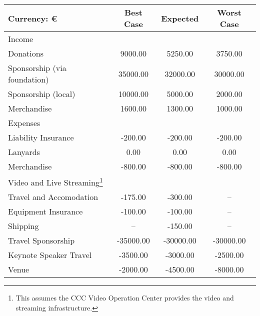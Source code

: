 \begin{tabularx}{\linewidth}{XSSS}
 Currency: \si{\euro}  & {Best Case} & {Expected} & {Worst Case} \\
  \hline\hline
Income \hspace*{1em}  & {} & {} & {}\\
\hspace*{1em} Donations  & 9000.00 & 5250.00 & 3750.00\\
\hspace*{1em} Sponsorship (via foundation)  & 35000.00 & 32000.00 & 30000.00\\
\hspace*{1em} Sponsorship (local)  & 10000.00 & 5000.00 & 2000.00\\
\hspace*{1em} Merchandise  & 1600.00 & 1300.00 & 1000.00\\[0.5ex]
Expenses \hspace*{1em}  & {} & {} & {}\\
\hspace*{1em} Liability Insurance  & -200.00 & -200.00 & -200.00\\
\hspace*{1em} Lanyards  & 0.00 & 0.00 & 0.00\\
\hspace*{1em} Merchandise  & -800.00 & -800.00 & -800.00\\
\hspace*{1em} Video and Live Streaming\footnote{This assumes the CCC Video Operation Center provides the video and streaming infrastructure.}  & {} & {} & {}\\
\hspace*{1em} \hspace*{1em} Travel and Accomodation & -175.00 & -300.00 & {–}\\
\hspace*{1em} \hspace*{1em} Equipment Insurance & -100.00 & -100.00 & {–}\\
\hspace*{1em} \hspace*{1em} Shipping & {–} & -150.00 & {–}\\
\hspace*{1em} Travel Sponsorship  & -35000.00 & -30000.00 & -30000.00\\
\hspace*{1em} Keynote Speaker Travel  & -3500.00 & -3000.00 & -2500.00\\
\hspace*{1em} Venue  & -2000.00 & -4500.00 & -8000.00\\

\end{tabularx}
